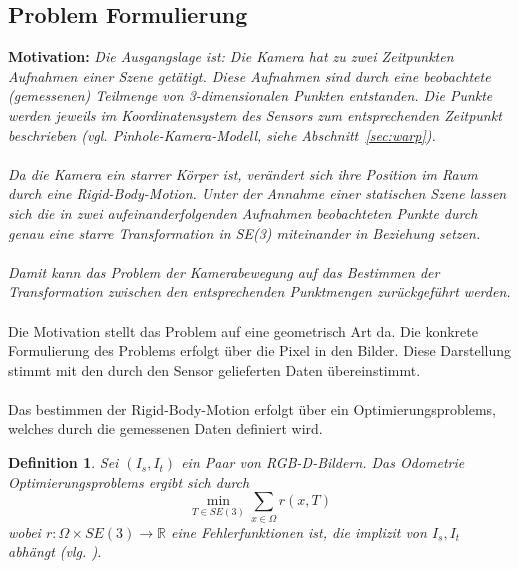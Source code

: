 \documentclass[12pt,DIV=15,BCOR=15mm,twoside,headsepline,abstract=true,listof=totoc,bibliography=totoc]{scrreprt}
\newtheorem{defi}{Definition}
\theoremstyle{remark}    %
\begin{document}
    \subsection{Problem Formulierung}
    \textbf{Motivation:} \emph{\label{mot:odom}Die Ausgangslage ist: Die Kamera hat zu zwei Zeitpunkten Aufnahmen einer Szene getätigt. Diese Aufnahmen sind durch
    eine beobachtete (gemessenen) Teilmenge von 3-dimensionalen Punkten entstanden. Die Punkte werden jeweils im Koordinatensystem des Sensors zum entsprechenden Zeitpunkt beschrieben 
    (vgl. Pinhole-Kamera-Modell, siehe Abschnitt~\ref{sec:warp}).\\\\
    Da die Kamera ein starrer Körper ist, verändert sich ihre Position im Raum durch eine Rigid-Body-Motion.
    Unter der Annahme einer statischen Szene lassen sich die in zwei aufeinanderfolgenden Aufnahmen beobachteten Punkte durch genau eine starre Transformation in SE(3) 
    miteinander in Beziehung setzen.\\\\
    Damit kann das Problem der Kamerabewegung auf das Bestimmen der Transformation zwischen den entsprechenden Punktmengen zurückgeführt werden.}\\\\
    Die Motivation stellt das Problem auf eine geometrisch Art da. Die konkrete Formulierung des Problems erfolgt über die Pixel in den Bilder. Diese Darstellung stimmt 
    mit den durch den Sensor gelieferten Daten übereinstimmt.\\\\
    Das bestimmen der Rigid-Body-Motion erfolgt über ein Optimierungsproblems, welches durch die gemessenen Daten definiert wird.
    \begin{defi}\label{def:odom}
        Sei  $(I_s, I_t)$ ein Paar von \ac{RGB-D}-Bildern. Das Odometrie Optimierungsproblems ergibt sich durch
        \[\min_{T \in SE(3)} \sum_{x \in \Omega} r(x, T) \]
        wobei $r: \Omega \times SE(3) \to \mathbb{R}$ eine Fehlerfunktionen ist, die implizit von  $I_s, I_t$
        abhängt (vlg. \cite{steinbruecker2011real}\cite{Park_2017_ICCV}). 
    \end{defi}
    
\end{document}
